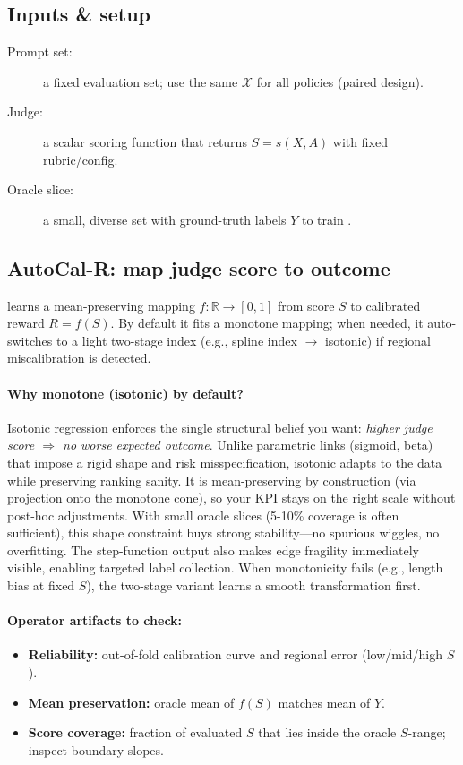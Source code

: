 \subsection{Inputs \& setup}

\begin{description}
\item[Prompt set:] a fixed evaluation set; use the same $\mathcal{X}$ for all policies (paired design).
\item[Judge:] a scalar scoring function that returns $S = s(X, A)$ with fixed rubric/config.
\item[Oracle slice:] a small, diverse set with ground-truth labels $Y$ to train \autocal.
\end{description}

\subsection{AutoCal-R: map judge score to outcome}

\autocal{} learns a mean-preserving mapping $f: \mathbb{R} \to [0,1]$ from score $S$ to calibrated reward $R = f(S)$. By default it fits a monotone mapping; when needed, it auto-switches to a light two-stage index (e.g., spline index $\to$ isotonic) if regional miscalibration is detected.

\paragraph{Why monotone (isotonic) by default?} Isotonic regression enforces the single structural belief you want: \emph{higher judge score $\Rightarrow$ no worse expected outcome}. Unlike parametric links (sigmoid, beta) that impose a rigid shape and risk misspecification, isotonic adapts to the data while preserving ranking sanity. It is mean-preserving by construction (via projection onto the monotone cone), so your KPI stays on the right scale without post-hoc adjustments. With small oracle slices (5-10\% coverage is often sufficient), this shape constraint buys strong stability---no spurious wiggles, no overfitting. The step-function output also makes edge fragility immediately visible, enabling targeted label collection. When monotonicity fails (e.g., length bias at fixed $S$), the two-stage variant learns a smooth transformation first.

\paragraph{Operator artifacts to check:}
\begin{itemize}
\item \textbf{Reliability:} out-of-fold calibration curve and regional error (low/mid/high $S$).
\item \textbf{Mean preservation:} oracle mean of $f(S)$ matches mean of $Y$.
\item \textbf{Score coverage:} fraction of evaluated $S$ that lies inside the oracle $S$-range; inspect boundary slopes.
\end{itemize}

